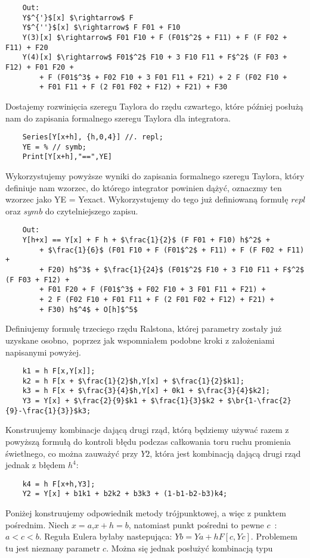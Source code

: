 \begin{lstlisting}
    Out:
    Y$^{'}$[x] $\rightarrow$ F
    Y$^{''}$[x] $\rightarrow$ F F01 + F10
    Y(3)[x] $\rightarrow$ F01 F10 + F (F01$^2$ + F11) + F (F F02 + F11) + F20
    Y(4)[x] $\rightarrow$ F01$^2$ F10 + 3 F10 F11 + F$^2$ (F F03 + F12) + F01 F20 + 
        + F (F01$^3$ + F02 F10 + 3 F01 F11 + F21) + 2 F (F02 F10 + 
        + F01 F11 + F (2 F01 F02 + F12) + F21) + F30
\end{lstlisting}
Dostajemy rozwinięcia szeregu Taylora do rzędu czwartego, które później posłużą nam do zapisania formalnego szeregu Taylora dla integratora. 
\begin{lstlisting}
    Series[Y[x+h], {h,0,4}] //. repl;
    YE = % // symb;
    Print[Y[x+h],"==",YE]
\end{lstlisting}
Wykorzystujemy powyższe wyniki do zapisania formalnego szeregu Taylora, który definiuje nam wzorzec, do którego integrator powinien dążyć, oznaczmy ten wzorzec jako YE = Yexact. Wykorzystujemy do tego już definiowaną formułę $repl$ oraz $symb$ do czytelniejszego zapisu. 
\begin{lstlisting}
    Out:
    Y[h+x] == Y[x] + F h + $\frac{1}{2}$ (F F01 + F10) h$^2$ +
        + $\frac{1}{6}$ (F01 F10 + F (F01$^2$ + F11) + F (F F02 + F11) +
        + F20) h$^3$ + $\frac{1}{24}$ (F01$^2$ F10 + 3 F10 F11 + F$^2$ (F F03 + F12) +
        + F01 F20 + F (F01$^3$ + F02 F10 + 3 F01 F11 + F21) +
        + 2 F (F02 F10 + F01 F11 + F (2 F01 F02 + F12) + F21) +
        + F30) h$^4$ + O[h]$^5$
\end{lstlisting}
Definiujemy formułę trzeciego rzędu Ralstona, której parametry zostały już uzyskane osobno,~poprzez jak wspomniałem podobne kroki z założeniami napisanymi powyżej.
\begin{lstlisting}
    k1 = h F[x,Y[x]];
    k2 = h F[x + $\frac{1}{2}$h,Y[x] + $\frac{1}{2}$k1];
    k3 = h F[x + $\frac{3}{4}$h,Y[x] + 0k1 + $\frac{3}{4}$k2];
    Y3 = Y[x] + $\frac{2}{9}$k1 + $\frac{1}{3}$k2 + $\br{1-\frac{2}{9}-\frac{1}{3}}$k3;
\end{lstlisting}
Konstruujemy kombinacje dającą drugi rząd, którą będziemy używać razem z powyższą formułą do kontroli błędu podczas całkowania toru ruchu promienia świetlnego, co można zauważyć przy $Y2$, która jest kombinacją dającą drugi rząd jednak z błędem $h^4$:
\begin{lstlisting}
    k4 = h F[x+h,Y3];
    Y2 = Y[x] + b1k1 + b2k2 + b3k3 + (1-b1-b2-b3)k4;
\end{lstlisting}
Poniżej konstruujemy odpowiednik metody trójpunktowej, a więc z punktem pośrednim. Niech $x=a$,\quad $x+h=b$, natomiast punkt pośredni to pewne $c$~: $a<c<b$. Reguła Eulera byłaby nastepująca: $Yb=Ya+h F[c,Yc] $. Problemem tu jest nieznany parametr $c$. Można się jednak posłużyć kombinacją typu
